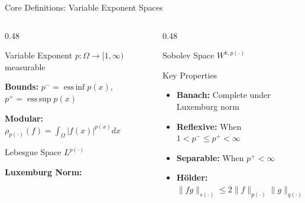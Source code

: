 \documentclass[11pt]{beamer}
\let\oldcite\cite
\renewcommand{\cite}[1]{\textcolor{red}{\textbf{\oldcite{#1}}}}
\begin{document}
	\begin{frame}{Core Definitions: Variable Exponent Spaces \cite{diening2011}}
		\begin{columns}[T]
			\begin{column}{0.48\textwidth}
				\begin{block}{Variable Exponent}
					\small
					$p: \Omega \to [1, \infty)$ measurable
					
					\textbf{Bounds:} $p^- = \operatorname*{ess\,inf} p(x)$, \; $p^+ = \operatorname*{ess\,sup} p(x)$
					
					\textbf{Modular:} $\displaystyle \rho_{p(\cdot)}(f) = \int_\Omega |f(x)|^{p(x)} dx$
				\end{block}
				
				\begin{block}{Lebesgue Space $L^{p(\cdot)}$}
					\small
					
					\vspace{0.2cm}
					\textbf{Luxemburg Norm:}
					
				\end{block}
			\end{column}
			
			\begin{column}{0.48\textwidth}
				\begin{block}{Sobolev Space $W^{k, p(\cdot)}$}
					\small
				\end{block}
				
				\begin{block}{Key Properties}
					\small
					\begin{itemize}
						\item \textbf{Banach:} Complete under Luxemburg norm
						\item \textbf{Reflexive:} When $1 < p^- \le p^+ < \infty$
						\item \textbf{Separable:} When $p^+ < \infty$
						\item \textbf{Hölder:} $\|fg\|_{s(\cdot)} \le 2\|f\|_{p(\cdot)}\|g\|_{q(\cdot)}$
					\end{itemize}
				\end{block}
			\end{column}
		\end{columns}
	\end{frame}
	
\end{document}

